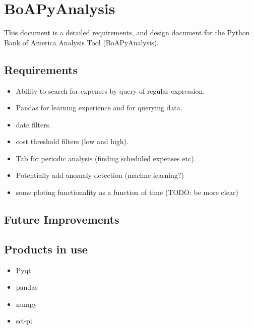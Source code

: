 \documentclass[12pt]{article}
\begin{document}
\section{BoAPyAnalysis}

This document is a detailed requirements, and design document for the Python Bank of America Analysis Tool (BoAPyAnalysis).


\subsection{Requirements}

\begin{itemize}
\item Ability to search for expenses by query of regular expression.
\item Pandas for learning experience and for querying data.
\item date filters.
\item cost threshold filters (low and high).
\item Tab for periodic analysis (finding scheduled expenses etc).
\item Potentially add anomaly detection (machne learning?)
\item some ploting functionality as a function of time (TODO: be more clear)
\end{itemize}


\subsection{Future Improvements}


\subsection{Products in use}

\begin{itemize}
\item Pyqt
\item pandas
\item numpy
\item sci-pi
\end{itemize}
\end{document}
